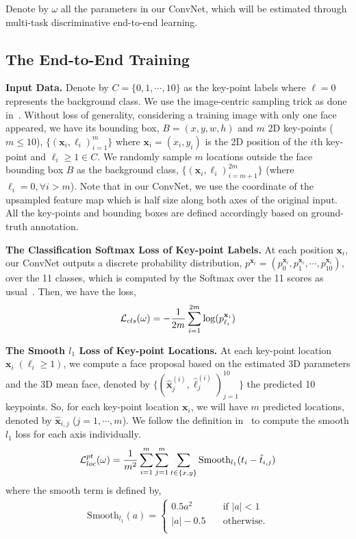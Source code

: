 \documentclass[runningheads]{llncs}
\begin{document}
Denote by $\omega$ all the parameters in our ConvNet, which will be estimated through multi-task discriminative end-to-end learning.

\subsection{The End-to-End Training}\label{sec:training}
\textbf{Input Data.} Denote by $C=\{0, 1, \cdots, 10\}$ as the key-point labels where $\ell=0$ represents the background class. We use the image-centric sampling trick as done in~\cite{FastRCNN,FasterRCNN}. Without loss of generality, considering a training image with only one face appeared, we have its bounding box, $B=(x, y, w, h)$ and $m$ 2D key-points ($m\leq 10$), $\{(\mathbf{x}_i, \ell_i)_{i=1}^m\}$ where $\mathbf{x}_i = (x_i, y_i)$ is the 2D position of the $i$th key-point and  $\ell_i \geq 1 \in C$. We randomly sample $m$ locations outside the face bounding box $B$ as the background class, $\{(\mathbf{x}_i, \ell_i)_{i=m+1}^{2m}\}$ (where $\ell_i=0,\forall i>m$). Note that in our ConvNet, we use the coordinate of the upsampled feature map which is half size along both axes of the original input. All the key-points and bounding boxes are defined accordingly based on ground-truth annotation.

\textbf{The Classification Softmax Loss of Key-point Labels.} At each position $\mathbf{x}_i$, our ConvNet outputs a discrete probability distribution, $p^{\mathbf{x}_i}=(p^{\mathbf{x}_i}_0, p^{\mathbf{x}_i}_1, \cdots, p^{\mathbf{x}_i}_{10})$, over the 11 classes, which is computed by the Softmax over the 11 scores as usual~\cite{AlexNet}. Then, we have the loss,
\begin{equation}
\mathcal{L}_{cls}(\omega) = -{1\over {2m}} \sum_{i=1}^{2m} \log(p_{\ell_i}^{\mathbf{x}_i})
\end{equation}

\textbf{The Smooth $l_1$ Loss of Key-point Locations.} At each key-point location $\mathbf{x}_i \; (\ell_i \ge 1)$, we compute a face proposal based on the estimated 3D parameters and the 3D mean face, denoted by $\{(\hat{\mathbf{x}}^{(i)}_j, \hat{\ell}_j^{(i)})_{j=1}^{10} \}$ the predicted 10 keypoints. So, for each key-point location $\mathbf{x}_i$, we will have $m$ predicted locations, denoted by $\hat{\mathbf{x}}_{i, j}$ ($j=1, \cdots, m$). 
We follow the definition in~\cite{FastRCNN} to compute the smooth $l_1$ loss for each axis individually.
\begin{align}
\mathcal{L}_{loc}^{pt}(\omega) = {1\over m^2}\sum_{i=1}^m \sum_{j=1}^{m} \sum_{\substack{t\in \{x, y\}}} \text{Smooth}_{l_1}(t_i-\hat{t}_{i,j})
\end{align}
where the smooth term is defined by,
\begin{align}
\text{Smooth}_{l_1}(a) = \begin{cases}
    0.5a^2       & \quad \text{if } |a| < 1\\
    |a| - 0.5  & \quad \text{otherwise}.\\
  \end{cases}
\end{align}
\end{document}
